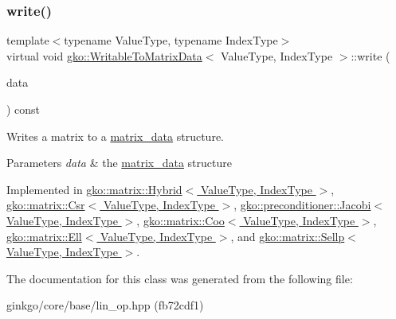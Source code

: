 \subsubsection{\texorpdfstring{write()}{write()}}
{\footnotesize\ttfamily template$<$typename Value\+Type, typename Index\+Type$>$ \\
virtual void \hyperlink{classgko_1_1WritableToMatrixData}{gko\+::\+Writable\+To\+Matrix\+Data}$<$ Value\+Type, Index\+Type $>$\+::write (\begin{DoxyParamCaption}\item[{\hyperlink{structgko_1_1matrix__data}{matrix\+\_\+data}$<$ Value\+Type, Index\+Type $>$ \&}]{data }\end{DoxyParamCaption}) const\hspace{0.3cm}{\ttfamily [pure virtual]}}



Writes a matrix to a \hyperlink{structgko_1_1matrix__data}{matrix\+\_\+data} structure. 


\begin{DoxyParams}{Parameters}
{\em data} & the \hyperlink{structgko_1_1matrix__data}{matrix\+\_\+data} structure \\
\hline
\end{DoxyParams}


Implemented in \hyperlink{classgko_1_1matrix_1_1Hybrid_a626c07541641bcdfd9a7f61322a89cbe}{gko\+::matrix\+::\+Hybrid$<$ Value\+Type, Index\+Type $>$}, \hyperlink{classgko_1_1matrix_1_1Csr_a205fc391f4cf4f7718a55b0a61f62bc9}{gko\+::matrix\+::\+Csr$<$ Value\+Type, Index\+Type $>$}, \hyperlink{classgko_1_1preconditioner_1_1Jacobi_ac52bb1c70d4882876da1ee21c3b124ee}{gko\+::preconditioner\+::\+Jacobi$<$ Value\+Type, Index\+Type $>$}, \hyperlink{classgko_1_1matrix_1_1Coo_ae193466ca1a4a3c7d1383ddc5a2701ab}{gko\+::matrix\+::\+Coo$<$ Value\+Type, Index\+Type $>$}, \hyperlink{classgko_1_1matrix_1_1Ell_afa9148a16a9255003055d8e9156ee941}{gko\+::matrix\+::\+Ell$<$ Value\+Type, Index\+Type $>$}, and \hyperlink{classgko_1_1matrix_1_1Sellp_aae2355a2866318b154d017b1c51f30a5}{gko\+::matrix\+::\+Sellp$<$ Value\+Type, Index\+Type $>$}.



The documentation for this class was generated from the following file\+:\begin{DoxyCompactItemize}
\item 
ginkgo/core/base/lin\+\_\+op.\+hpp (fb72cdf1)\end{DoxyCompactItemize}

